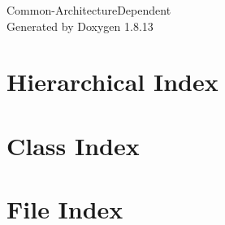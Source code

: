 \documentclass[twoside]{book}
\newcommand{\+}{\discretionary{\mbox{\scriptsize$\hookleftarrow$}}{}{}}
\newcommand{\clearemptydoublepage}{%
  \newpage{\pagestyle{empty}\cleardoublepage}%
}
\begin{document}
\hypersetup{pageanchor=false,
             bookmarksnumbered=true,
             pdfencoding=unicode
            }
\begin{titlepage}
\vspace*{7cm}
\begin{center}%
{\Large Common-\/\+Architecture\+Dependent }\\
\vspace*{1cm}
{\large Generated by Doxygen 1.8.13}\\
\end{center}
\end{titlepage}
\clearemptydoublepage
{}
\tableofcontents
\clearemptydoublepage
{}
\hypersetup{pageanchor=true}

\chapter{Hierarchical Index}

\chapter{Class Index}

\chapter{File Index}

\end{document}
